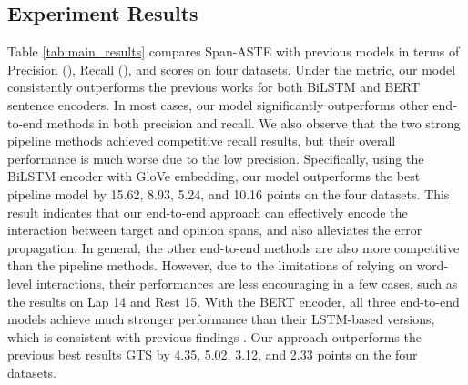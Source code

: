 \documentclass[11pt,a4paper]{article}
\begin{document}
\subsection{Experiment Results}
Table \ref{tab:main_results} 
compares Span-ASTE with previous models in terms of Precision (), Recall (), and  scores on four datasets. 
Under the  metric, our model consistently outperforms the previous works for 
both BiLSTM and BERT sentence encoders.
In most cases, our model significantly outperforms other end-to-end methods in both precision and recall.
We also observe that
the two strong pipeline methods \cite{li2019unified,peng2019knowing} achieved competitive recall results, but
their overall performance is much worse due to the low precision.
Specifically, using the BiLSTM encoder with GloVe embedding, our model outperforms the best pipeline model \cite{peng2019knowing} by 15.62, 8.93, 5.24, and 10.16  points on the four datasets. 
This result indicates that our end-to-end approach can effectively encode the interaction between target and opinion spans, and also alleviates the error propagation. 
In general, the other end-to-end methods are also more competitive than the pipeline methods.
However, due to the limitations of relying on word-level interactions, their performances are less encouraging in a few cases, such as the results on Lap 14 and Rest 15.
With the BERT encoder, all three end-to-end models
achieve much stronger performance than their LSTM-based versions, which 
is consistent with previous findings 
\cite{devlin2019bert}.
Our approach outperforms the previous best results GTS \cite{wu-etal-2020-grid} by 4.35, 5.02,	3.12, and	2.33  points on the four datasets.  
\end{document}
